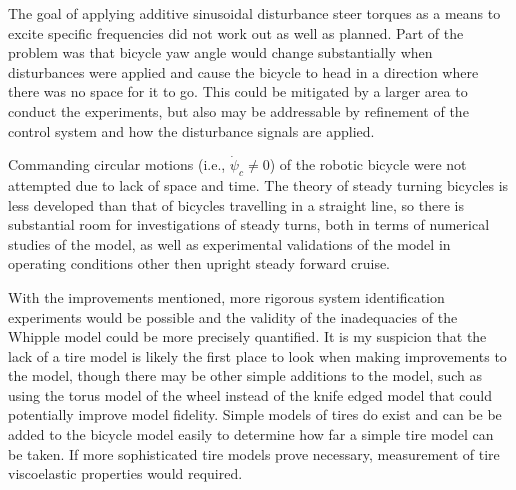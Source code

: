 The goal of applying additive sinusoidal disturbance steer torques as a means
to excite specific frequencies did not work out as well as planned.  Part of
the problem was that bicycle yaw angle would change substantially when
disturbances were applied and cause the bicycle to head in a direction where
there was no space for it to go. This could be mitigated by a larger area to
conduct the experiments, but also may be addressable by refinement of the
control system and how the disturbance signals are applied.

Commanding circular motions (i.e., $\dot{\psi}_c \ne 0$) of the robotic bicycle
were not attempted due to lack of space and time. The theory of steady turning
bicycles is less developed than that of bicycles travelling in a straight line,
so there is substantial room for investigations of steady turns, both in terms
of numerical studies of the model, as well as experimental validations of the
model in operating conditions other then upright steady forward cruise.

With the improvements mentioned, more rigorous system identification
experiments would be possible and the validity of the inadequacies of the
Whipple model could be more precisely quantified. It is my suspicion that the
lack of a tire model is likely the first place to look when making improvements
to the model, though there may be other simple additions to the model, such as
using the torus model of the wheel instead of the knife edged model that could
potentially improve model fidelity. Simple models of tires do exist and can be
be added to the bicycle model easily to determine how far a simple tire model
can be taken. If more sophisticated tire models prove necessary, measurement of
tire viscoelastic properties would required.

